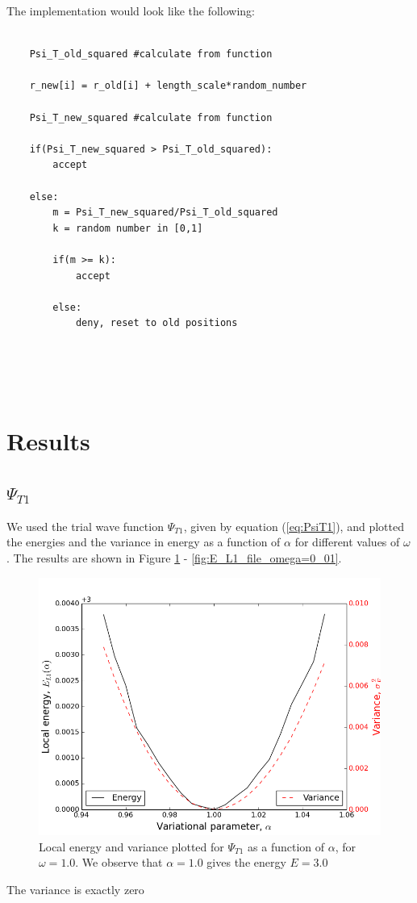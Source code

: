 \documentclass[norsk,a4paper,12pt]{article}
\begin{document}
\par 
\vspace{3mm}

The implementation would look like the following:

\begin{lstlisting}
    
    Psi_T_old_squared #calculate from function
    
    r_new[i] = r_old[i] + length_scale*random_number
    
    Psi_T_new_squared #calculate from function
    
    if(Psi_T_new_squared > Psi_T_old_squared):
        accept
    
    else:
        m = Psi_T_new_squared/Psi_T_old_squared
        k = random number in [0,1]
        
        if(m >= k):
            accept
            
        else:
            deny, reset to old positions
    
    
    
    
\end{lstlisting}

\section{Results}
\subsection{$\Psi_{T1}$}

We used the trial wave function $\Psi_{T1}$, given by equation (\ref{eq:PsiT1}), and plotted the energies and the variance in energy as a function of $\alpha$ for different values of $\omega$. The results are shown in Figure \ref{fig:E_L1_file_omega=1_0} - \ref{fig:E_L1_file_omega=0_01}.

\begin{figure} [H]
    \centering
    \includegraphics[scale=0.65]{E_L1_variance_omega=1_0}
    \caption{Local energy and variance plotted  for $\Psi_{T1}$ as a function of $\alpha$, for $\omega = 1.0$. We observe that $\alpha = 1.0$ gives the energy $E=3.0$ }
    \label{fig:E_L1_file_omega=1_0}
\end{figure}
The variance is exactly zero 
\end{document}
